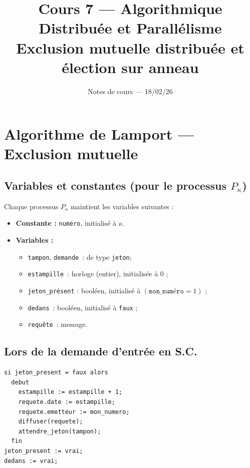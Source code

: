 \documentclass[12pt,a4paper]{article}
\title{\textbf{Cours 7 --- Algorithmique Distribuée et Parallélisme}\\
\large Exclusion mutuelle distribuée et élection sur anneau}
\author{Notes de cours --- 18/02/26}
\date{}
\theoremstyle{definition}
\theoremstyle{plain}
\theoremstyle{remark}
\newcommand{\jeton}{\texttt{jeton}}
\newcommand{\tampon}{\texttt{tampon}}
\newcommand{\estampille}{\texttt{estampille}}
\newcommand{\demande}{\texttt{demande}}
\newcommand{\dedans}{\texttt{dedans}}
\newcommand{\requete}{\texttt{requête}}
\begin{document}
\maketitle
\tableofcontents
\newpage

\section{Algorithme de Lamport --- Exclusion mutuelle}

\subsection{Variables et constantes (pour le processus $P_\kappa$)}

Chaque processus $P_\kappa$ maintient les variables suivantes :

\begin{itemize}[leftmargin=2em]
  \item \textbf{Constante :} \texttt{numéro}, initialisé à $\kappa$.
  \item \textbf{Variables :}
  \begin{itemize}
    \item \tampon, \demande\ : de type \jeton ;
    \item \estampille\ : horloge (entier), initialisée à $0$ ;
    \item \texttt{jeton\_présent} : booléen, initialisé à $(\texttt{mon\_numéro} = 1)$ ;
    \item \dedans\ : booléen, initialisé à \texttt{faux} ;
    \item \requete\ : message.
  \end{itemize}
\end{itemize}

\subsection{Lors de la demande d'entrée en S.C.}

\begin{lstlisting}[caption={Demande d'entrée en section critique}]
si jeton_present = faux alors
  debut
    estampille := estampille + 1;
    requete.date := estampille;
    requete.emetteur := mon_numero;
    diffuser(requete);
    attendre_jeton(tampon);
  fin
jeton_present := vrai;
dedans := vrai;
\end{lstlisting}
\end{document}
